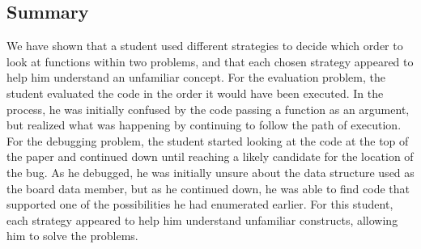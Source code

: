 

\subsection{Summary}
We have shown that a student used different strategies to decide which order to look at functions within two problems, and that each chosen strategy appeared to help him understand an unfamiliar concept.
For the evaluation problem, the student evaluated the code in the order it would have been executed. 
In the process, he was initially confused by the code passing a function as an argument, but realized what was happening by continuing to follow the path of execution. 
For the debugging problem, the student started looking at the code at the top of the paper and continued down until reaching a likely candidate for the location of the bug. 
As he debugged, he was initially unsure about the data structure used as the board data member, but as he continued down, he was able to find code that supported one of the possibilities he had enumerated earlier.
For this student, each strategy appeared to help him understand unfamiliar constructs, allowing him to solve the problems. 


